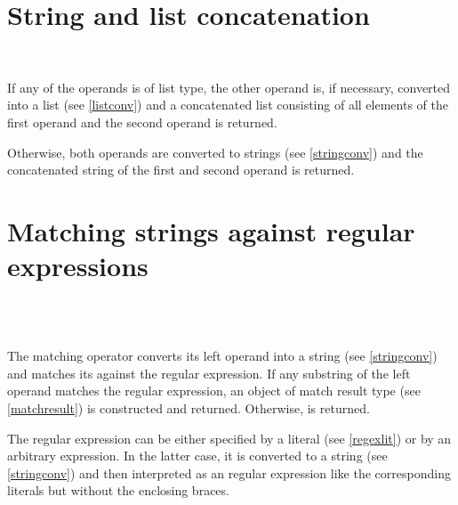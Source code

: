 \section{String and list concatenation}

\begin{grammar}
      \produces {} \\
      \produces {}
         \lextoken{\&} 
\end{grammar}

\noindent
If any of the operands is of list type, the other operand is, if
necessary, converted into a list (see \ref{listconv}) and a
concatenated list consisting of all elements of the first operand
and the second operand is returned.

Otherwise, both operands are converted to strings (see \ref{stringconv})
and the concatenated string of the first and second operand is returned.

\section{Matching strings against regular expressions}

\begin{grammar}
      \produces {} \\
      \produces {}
         \lextoken{=\tildeSY}  \\
      \produces {}
         \lextoken{=\tildeSY} 
\end{grammar}

\noindent
The matching operator converts its left operand into a string
(see \ref{stringconv}) and matches its against the regular
expression. If any substring of the
left operand matches the regular expression, an object of match
result type (see \ref{matchresult})
is constructed and returned. Otherwise,  is returned.

The regular expression can be either specified by a literal
(see \ref{regexlit}) or by an arbitrary expression. In the latter
case, it is converted to a string (see \ref{stringconv}) and
then interpreted as an regular expression like the corresponding
literals but without the enclosing braces.

